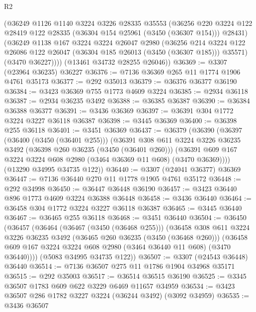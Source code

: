 \begin{lexlean}{R2}
\begin{coremodule}
        (@36249
          @1126
          @1140
          @3224
          @3226
          @28335
          @35553
          (@36256
            @220
            @3224
            @122
            @28419
            @122
            @28335
            (@36304 @154 @25961 (@3450 (@36307 @154)))
            @28431)
          (@36249
            @1138
            @167
            @3224
            @3224
            @26047
            @2980
            (@36256
              @214
              @3224
              @122
              @26086
              @122
              @26047
              (@36304 @185 @26013 (@3450 (@36307 @185)))
              @35571)
            (@3470 @36227))))
      (@13461 @34732 @28255 @26046))
@36369 := @3307 (@23964 @36235) @36227
@36376 := @7136 @36369 @265 @11 @1774 @1906 @4761 @35173
@36377 := @292 @35013
@36379 := @36376 @36377 @36190
@36384 := @3423 @36369 @755 @1773 @4609 @3224
@36385 := @2934 @36118
@36387 := @2934 @36235 @3492
@36388 := @36385 @36387
@36390 := @36384 @36388 @36377
@36391 := @3436 @36369
@36397 := @36391 @304 @1772 @3224 @3227 @36118 @36387
@36398 := @3445 @36369
@36400 := @36398 @255 @36118
@36401 := @3451 @36369
@36437 := @36379
    (@36390
      (@36397
        (@36400 (@3450 (@36401 @255)))
        (@36391
          @308
          @611
          @3224
          @3226
          @36235
          @3492
          (@36398 @260 @36235 (@3450 (@36401 @260)))
          (@36391 @609 @167 @3224 @3224 @608 @2980 (@3464 @36369 @11 @608) (@3470 @36369))))
      (@13290 @34995 @34735 @122))
@36440 := @3307 (@24041 @36377) @36369
@36447 := @7136 @36440 @270 @11 @1778 @1905 @4761 @35172
@36448 := @292 @34998
@36450 := @36447 @36448 @36190
@36457 := @3423 @36440 @896 @1773 @4609 @3224 @36388 @36448
@36458 := @3436 @36440
@36464 := @36458 @304 @1772 @3224 @3227 @36118 @36387
@36465 := @3445 @36440
@36467 := @36465 @255 @36118
@36468 := @3451 @36440
@36504 := @36450
    (@36457
      (@36464
        (@36467 (@3450 (@36468 @255)))
        (@36458
          @308
          @611
          @3224
          @3226
          @36235
          @3492
          (@36465 @260 @36235 (@3450 (@36468 @260)))
          (@36458 @609 @167 @3224 @3224 @608 @2980 (@3464 @36440 @11 @608) (@3470 @36440))))
      (@5083 @34995 @34735 @122))
@36507 := @3307 (@24543 @36448) @36440
@36514 := @7136 @36507 @275 @11 @1786 @1904 @34968 @35171
@36515 := @292 @35003
@36517 := @36514 @36515 @36190
@36525 := @3345 @36507 @1783 @609 @622 @3229 @6469 @11657 @34959
@36534 := @3423 @36507 @286 @1782 @3227 @3224 (@36244 @3492) (@3092 @34959)
@36535 := @3436 @36507

\end{coremodule}
\end{lexlean}
